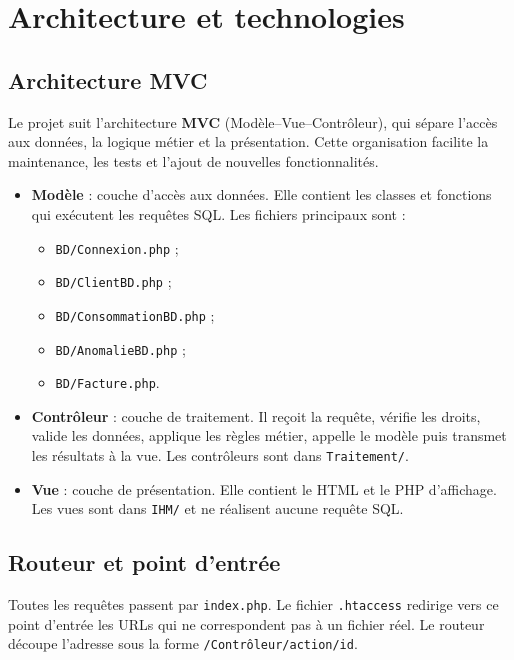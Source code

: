 \section{Architecture et technologies}

\subsection{Architecture MVC}

Le projet suit l'architecture \textbf{MVC} (Modèle--Vue--Contrôleur), qui sépare l'accès aux données, la logique métier et la présentation. Cette organisation facilite la maintenance, les tests et l'ajout de nouvelles fonctionnalités.

\begin{itemize}[leftmargin=*]
  \item \textbf{Modèle} : couche d'accès aux données. Elle contient les classes et fonctions qui exécutent les requêtes SQL. Les fichiers principaux sont :
  \begin{itemize}
    \item \texttt{BD/Connexion.php} ;
    \item \texttt{BD/ClientBD.php} ;
    \item \texttt{BD/ConsommationBD.php} ;
    \item \texttt{BD/AnomalieBD.php} ;
    \item \texttt{BD/Facture.php}.
  \end{itemize}
  \item \textbf{Contrôleur} : couche de traitement. Il reçoit la requête, vérifie les droits, valide les données, applique les règles métier, appelle le modèle puis transmet les résultats à la vue. Les contrôleurs sont dans \texttt{Traitement/}.
  \item \textbf{Vue} : couche de présentation. Elle contient le HTML et le PHP d'affichage. Les vues sont dans \texttt{IHM/} et ne réalisent aucune requête SQL.
\end{itemize}

\subsection{Routeur et point d'entrée}

Toutes les requêtes passent par \texttt{index.php}. Le fichier \texttt{.htaccess} redirige vers ce point d'entrée les URLs qui ne correspondent pas à un fichier réel. Le routeur découpe l'adresse sous la forme \texttt{/Contrôleur/action/id}.

